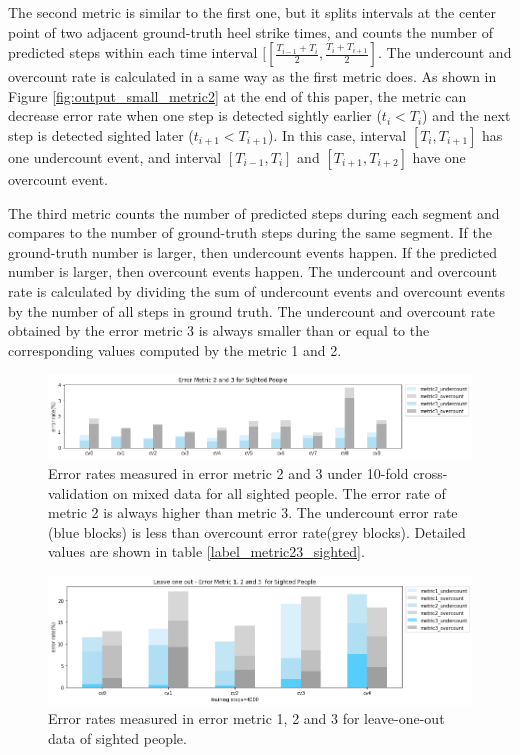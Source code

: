 \documentclass[11pt]{article}
\begin{document}
{The second metric is similar to the first one,  but it  splits intervals at the center point of two adjacent ground-truth heel strike times, and counts the number of predicted steps within each time interval $[[\frac{T_{i-1}+T_i}{2}, \frac{T_i+T_{i+1}}{2}]$. The undercount and overcount rate is calculated in a same way as the first metric does. As shown in Figure \ref{fig:output_small_metric2} at the end of this paper,  the metric can decrease error rate when one step is detected sightly earlier ($t_i<T_i$) and the next step is detected sighted later ($t_{i+1}<T_{i+1}$). In this case, interval $[T_i, T_{i+1}]$ has one undercount event, and interval $[T_{i-1}, T_i]$ and $[T_{i+1}, T_{i+2}]$ have one overcount event.

The third metric counts the number of predicted steps during each segment and compares to the number of ground-truth steps during the same segment. If the ground-truth number is larger, then undercount events happen. If the predicted number is larger, then overcount events happen. The undercount and overcount rate is calculated by dividing the sum of undercount events and overcount events by the number of all steps in ground truth. The undercount and overcount rate obtained by the error metric 3 is always smaller than or equal to the corresponding values computed by the metric 1 and 2.

\begin{figure}[ht]
\centering
\includegraphics[scale=0.5]{error_metric_23_na_10fold}
\caption{Error rates measured in error metric 2 and 3 under 10-fold cross-validation on mixed data for all sighted people. The error rate of metric 2 is always higher than metric 3. The undercount error rate (blue blocks) is less than overcount error rate(grey blocks). Detailed values are shown in table \ref{label_metric23_sighted}.}
\label{fig:error_metric_23_na_10fold}
\end{figure}

\begin{figure}[ht]
\centering
\includegraphics[scale=0.5]{error_metric_123_na_5fold}
\caption{Error rates measured in error metric 1, 2 and 3 for leave-one-out data of sighted people.}
\label{fig:error_metric_123_na_5fold}
\end{figure}


}
\end{document}
